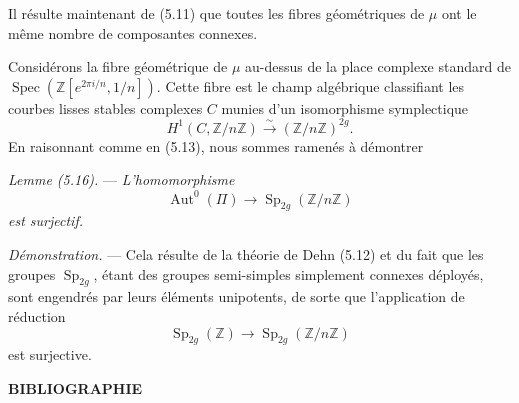 \documentclass[10pt]{article}
\newcommand{\Spec}{\operatorname{Spec}}
\newcommand{\Aut}{\operatorname{Aut}}
\begin{document}
Il résulte maintenant de (5.11) que toutes les fibres géométriques de $\mu$ ont le même nombre de composantes connexes.

Considérons la fibre géométrique de $\mu$ au-dessus de la place complexe standard de $\Spec(\mathbb Z[e^{2\pi i/n},1/n])$. Cette fibre est le champ algébrique classifiant les courbes lisses stables complexes $C$ munies d'un isomorphisme symplectique
\[
H^1(C,\mathbb Z/n\mathbb Z)\xrightarrow{\sim}(\mathbb Z/n\mathbb Z)^{2g}.
\]
En raisonnant comme en (5.13), nous sommes ramenés à démontrer

\medskip
\noindent\emph{Lemme (5.16).} --- \emph{L'homomorphisme}
\[
\Aut^0(\Pi)\longrightarrow \operatorname{Sp}_{2g}(\mathbb Z/n\mathbb Z)
\]
\emph{est surjectif.}

\noindent\emph{Démonstration.} --- Cela résulte de la théorie de Dehn (5.12) et du fait que les groupes $\operatorname{Sp}_{2g}$, étant des groupes semi-simples simplement connexes déployés, sont engendrés par leurs éléments unipotents, de sorte que l'application de réduction
\[
\operatorname{Sp}_{2g}(\mathbb Z)\longrightarrow \operatorname{Sp}_{2g}(\mathbb Z/n\mathbb Z)
\]
est surjective.

\begin{center}
{\bfseries BIBLIOGRAPHIE}
\end{center}
\end{document}
